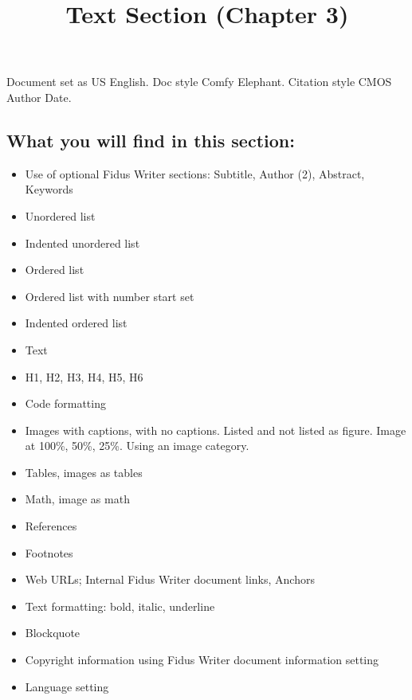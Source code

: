 \documentclass{article}
\begin{document}
\title{Text Section (Chapter 3)}

\maketitle


Document set as US English. Doc style Comfy Elephant. Citation style CMOS Author Date.


\subsection{What you will find in this section:}\label{H1003956}


\begin{itemize}
\item Use of optional Fidus Writer sections: Subtitle, Author (2), Abstract, Keywords


\item Unordered list


\item Indented unordered list


\item Ordered list


\item Ordered list with number start set


\item Indented ordered list


\item Text


\item H1, H2, H3, H4, H5, H6


\item Code formatting


\item Images with captions, with no captions. Listed and not listed as figure. Image at 100\%, 50\%, 25\%. Using an image category.


\item Tables, images as tables


\item Math, image as math


\item References


\item Footnotes


\item Web URLs; Internal Fidus Writer document links, Anchors


\item Text formatting: bold, italic, underline


\item Blockquote


\item Copyright information using Fidus Writer document information setting


\item Language setting


\end{itemize}
\end{document}

